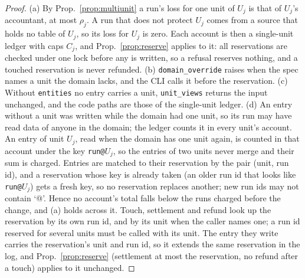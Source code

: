 \begin{proof}
(a) By Prop.~\ref{prop:multiunit} a run's loss for one unit of $U_j$ is that of $U_j$'s accountant, at most $\rho_j$. A run that does not protect $U_j$ comes from a source that holds no table of $U_j$, so its loss for $U_j$ is zero. Each account is then a single-unit ledger with caps $C_j$, and Prop.~\ref{prop:reserve} applies to it: all reservations are checked under one lock before any is written, so a refusal reserves nothing, and a touched reservation is never refunded. (b) \texttt{domain\_override} raises when the spec names a unit the domain lacks, and the CLI calls it before the reservation. (c) Without \texttt{entities} no entry carries a unit, \texttt{unit\_views} returns the input unchanged, and the code paths are those of the single-unit ledger. (d) An entry without a unit was written while the domain had one unit, so its run may have read data of anyone in the domain; the ledger counts it in every unit's account. An entry of unit $U_j$, read when the domain has one unit again, is counted in that account under the key \texttt{run@}$U_j$, so the entries of two units never merge and their sum is charged. Entries are matched to their reservation by the pair (unit, run id), and a reservation whose key is already taken (an older run id that looks like \texttt{run@}$U_j$) gets a fresh key, so no reservation replaces another; new run ids may not contain `@'. Hence no account's total falls below the runs charged before the change, and (a) holds across it. Touch, settlement and refund look up the reservation by its own run id, and by its unit when the caller names one; a run id reserved for several units must be called with its unit. The entry they write carries the reservation's unit and run id, so it extends the same reservation in the log, and Prop.~\ref{prop:reserve} (settlement at most the reservation, no refund after a touch) applies to it unchanged.
\end{proof}
